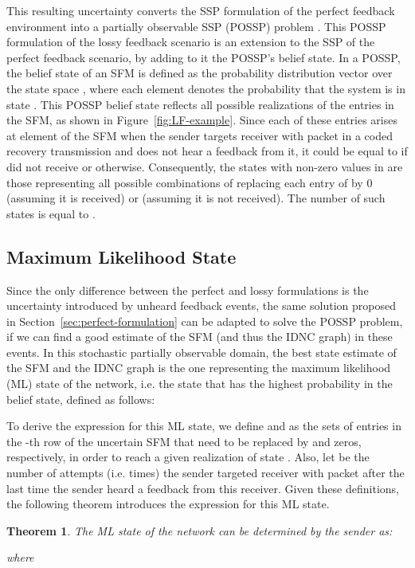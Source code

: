 \documentclass[10pt,jounral]{IEEEtran}
\newtheorem{theorem}{Theorem}
\newcommand{\sref}[1]{Section~\ref{#1}}
\newcommand{\fref}[1]{Figure~\ref{#1}}
\begin{document}
This resulting uncertainty converts the SSP formulation of the perfect feedback environment into a partially observable SSP (POSSP) problem \cite{Patek99onpartially}. This POSSP formulation of the lossy feedback scenario is an extension to the SSP of the perfect feedback scenario, by adding to it the POSSP's belief state. In a POSSP, the belief state  of an SFM  is defined as the probability distribution vector over the state space , where each element  denotes the probability that the system is in state . This POSSP belief state reflects all possible realizations of the entries  in the SFM, as shown in \fref{fig:LF-example}. Since each of these  entries arises at element  of the SFM when the sender targets receiver  with packet  in a coded recovery transmission and does not hear a feedback from it, it could be equal to  if  did not receive  or  otherwise. Consequently, the states with non-zero values in  are those representing all possible combinations of replacing each  entry of  by 0 (assuming it is received) or  (assuming it is not received). The number of such states is equal to .



\subsection{Maximum Likelihood State} \label{sec:belief}
Since the only difference between the perfect and lossy formulations is the uncertainty introduced by unheard feedback events, the same solution proposed in \sref{sec:perfect-formulation} can be adapted to solve the POSSP problem, if we can find a good estimate of the SFM (and thus the IDNC graph) in these events. In this stochastic partially observable domain, the best state estimate of the SFM and the IDNC graph is the one representing the maximum likelihood (ML) state of the network, i.e. the state that has the highest probability in the belief state, defined as follows:


To derive the expression for this ML state, we define  and  as the sets of  entries in the -th row of the uncertain SFM  that need to be replaced by  and zeros, respectively, in order to reach a given realization  of state . Also, let  be the number of attempts (i.e. times) the sender targeted receiver  with packet  after the last time the sender heard a feedback from this receiver. Given these definitions, the following theorem introduces the expression for this ML state.
\begin{theorem}\label{th:ML}
The ML state of the network can be determined by the sender as:

where

\end{theorem}
\end{document}
